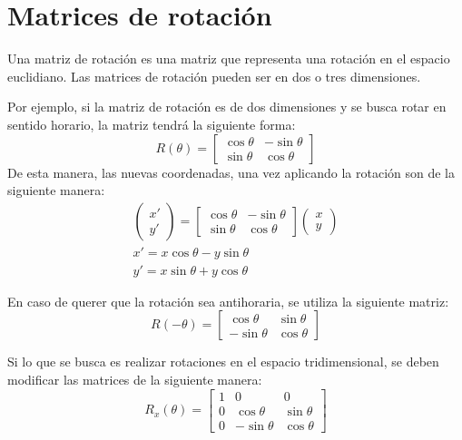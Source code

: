 
\section{Matrices de rotaci\'on}
	Una matriz de rotaci\'on es una matriz que representa una rotaci\'on en el espacio euclidiano.
	Las matrices de rotaci\'on pueden ser en dos o tres dimensiones.
	
	Por ejemplo, si la matriz de rotaci\'on es de dos dimensiones y se busca rotar en sentido horario, la matriz tendrá la siguiente forma:
	\begin{equation}
		R(\theta)=
		\begin{bmatrix}
			\cos \theta & -\sin \theta\\
			\sin \theta & \cos \theta
		\end{bmatrix}
	\end{equation}
	De esta manera, las nuevas coordenadas, una vez aplicando la rotación son de la siguiente manera:
	\begin{eqnarray}
		\left(
		\begin{matrix}
			x'\\
			y'
		\end{matrix}
		\right)
		=
		\begin{bmatrix}
			\cos \theta & -\sin \theta\\
			\sin \theta & \cos \theta
		\end{bmatrix}
		\left(
		\begin{matrix}
			x\\
			y
		\end{matrix}
		\right)\\
		x'=x\cos \theta -y\sin \theta\\
		y'=x\sin \theta + y \cos \theta
	\end{eqnarray}

En caso de querer que la rotación sea antihoraria, se utiliza la siguiente matriz:
\begin{equation}
	R(-\theta)=
	\begin{bmatrix}
		\cos \theta & \sin \theta\\
		-\sin \theta & \cos \theta
	\end{bmatrix}
\end{equation}

Si lo que se busca es realizar rotaciones en el espacio tridimensional, se deben modificar las matrices de la siguiente manera:
\begin{equation}
	R_x(\theta)=
	\begin{bmatrix}
		1 & 0 & 0\\
		0 & \cos \theta & \sin \theta\\
		0 & -\sin \theta & \cos \theta
	\end{bmatrix}
\end{equation}

